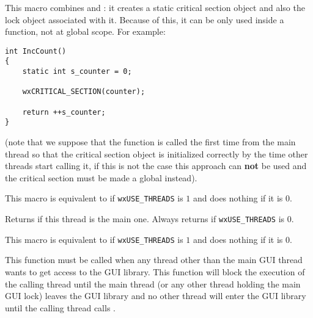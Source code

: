 
This macro combines  and
: it creates a static critical
section object and also the lock object associated with it. Because of this, it
can be only used inside a function, not at global scope. For example:

\begin{verbatim}
int IncCount()
{
    static int s_counter = 0;

    wxCRITICAL_SECTION(counter);

    return ++s_counter;
}
\end{verbatim}

(note that we suppose that the function is called the first time from the main
thread so that the critical section object is initialized correctly by the time
other threads start calling it, if this is not the case this approach can
{\bf not} be used and the critical section must be made a global instead).



\label{wxentercritsect}


This macro is equivalent to  if
{\tt wxUSE\_THREADS} is $1$ and does nothing if it is $0$.



\label{wxismainthread}


Returns \true if this thread is the main one. Always returns \true if
{\tt wxUSE\_THREADS} is $0$.



\label{wxleavecritsect}


This macro is equivalent to  if
{\tt wxUSE\_THREADS} is $1$ and does nothing if it is $0$.



\label{wxmutexguienter}


This function must be called when any thread other than the main GUI thread
wants to get access to the GUI library. This function will block the execution
of the calling thread until the main thread (or any other thread holding the
main GUI lock) leaves the GUI library and no other thread will enter the GUI
library until the calling thread calls .

